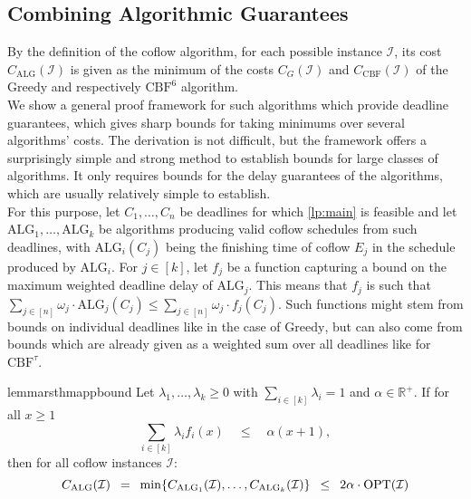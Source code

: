 \documentclass[11pt]{article}
\newcommand{\Hquad}{\hspace{0.5em}}
\begin{document}
\subsection{Combining Algorithmic Guarantees}\label{sec:combalgguarantees}
By the definition of the coflow algorithm, for each possible instance $\mathcal{I}$, its cost $C_{\mathrm{ALG}}(\mathcal{I})$ is given as the minimum of the costs $C_G(\mathcal{I})$ and $C_{\mathrm{CBF}}(\mathcal{I})$ of the $\mathrm{Greedy}$ and respectively $\mathrm{CBF}^6$ algorithm.\\
We show a general proof framework for such algorithms which provide deadline guarantees, which gives sharp bounds for taking minimums over several algorithms' costs. The derivation is not difficult, but the framework offers a surprisingly simple and strong method to establish bounds for large classes of algorithms. It only requires bounds for the delay guarantees of the algorithms, which are usually relatively simple to establish.\\
For this purpose, let $C_1,\dotsc,C_n$ be deadlines for which \ref{lp:main} is feasible and let $\mathrm{ALG}_1,\dotsc,\mathrm{ALG}_k$ be algorithms producing valid coflow schedules from such deadlines, with $\mathrm{ALG}_i(C_j)$ being the finishing time of coflow $E_j$ in the schedule produced by $\mathrm{ALG}_i$. For $j \in [k]$, let $f_j$ be a function capturing a bound on the maximum weighted deadline delay of $\mathrm{ALG}_j$. This means that $f_j$ is such that $\sum_{j \in [n]}\omega_j \cdot \mathrm{ALG}_j(C_j) \le \sum_{j \in [n]}\omega_j \cdot f_j(C_j)$. Such functions might stem from bounds on individual deadlines like in the case of $\mathrm{Greedy}$, but can also come from bounds which are already given as a weighted sum over all deadlines like for $\mathrm{CBF}^\tau$.

\begin{restatable}{lemma}{rsthmappbound}
\label{lemma:appbound}
Let $\lambda_1,\dotsc,\lambda_k \ge 0$ with $\sum_{i \in [k]}\lambda_i = 1$ and $\alpha \in \mathbb{R}^+$. If for all $x \ge 1$
\begin{equation*}
    \sum_{i \in [k]}\lambda_i f_i(x) \quad \le \quad \alpha(x+1),
\end{equation*}
then for all coflow instances $\mathcal{I}$:
\begin{equation*}
    C_{\mathrm{ALG}}(\mathcal{I}) \Hquad=\Hquad \min\{C_{\mathrm{ALG}_1}(\mathcal{I}),\dotsc,C_{\mathrm{ALG}_k}(\mathcal{I})\} \Hquad\le\Hquad 2\alpha \cdot \mathrm{OPT}(\mathcal{I})
\end{equation*}
\end{restatable}
\end{document}
